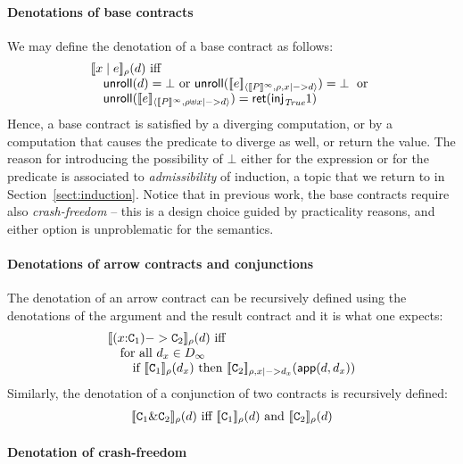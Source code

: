 \paragraph{Denotations of base contracts}
We may define the denotation of a base contract as follows: 
\[\begin{array}{l}
    \dbrace{x \mid e}_\rho(d) \text{ iff } \\
        \quad \unroll(d) = \bot \text{ or } 
        \unroll(\interp{e}{\dbrace{P}^\infty}{\rho,x|->d}) = \bot\;\text{ or } \\
        \quad \unroll(\interp{e}{\dbrace{P}^\infty}{\rho \uplus x|->d}) = \ret(\inj{\True} 1) 
\end{array}\] 
Hence, a base contract is satisfied by a diverging computation, or by a computation that causes the 
predicate to diverge as well, or return the \True value. The reason for introducing the possibility of
$\bot$ either for the expression or for the predicate is associated to {\em admissibility} of induction, 
a topic that we return to in Section~\ref{sect:induction}. Notice that in previous work, the base 
contracts require also {\em crash-freedom} -- this is a design choice guided by practicality reasons, 
and either option is unproblematic for the semantics. 

\paragraph{Denotations of arrow contracts and conjunctions} 
The denotation of an arrow contract can be recursively defined using the denotations of the argument
and the result contract and it is what one expects: 
\[\begin{array}{l}
    [\![(x{:}{\tt C}_1) -> {\tt C}_2]\!]_{\rho}(d) \mbox{ iff } \\
        \quad \mbox{for all } d_x \in D_\infty \\ 
        \quad\quad \mbox{if }
                     [\![{\tt C}_1]\!]_\rho(d_x)\mbox{ then }
                     [\![{\tt C}_2]\!]_{\rho,x|->d_x}(\mathsf{app}(d,d_x)) 
\end{array}\]
Similarly, the denotation of a conjunction of two contracts is recursively defined:
\[\begin{array}{l}
    [\![{\tt C}_1 \& {\tt C}_2]\!]_\rho(d) \mbox{ iff } 
       [\![{\tt C}_1]\!]_\rho(d) \mbox{ and } 
       [\![{\tt C}_2]\!]_\rho(d)
\end{array}\]

\paragraph{Denotation of crash-freedom}

